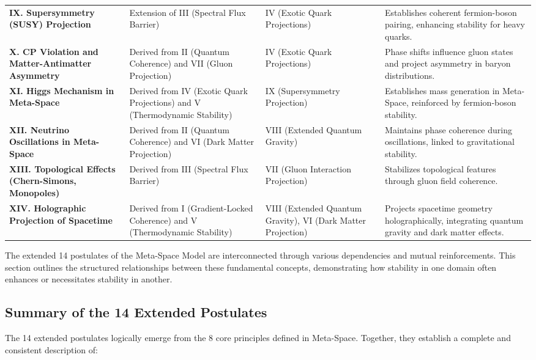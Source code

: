 \documentclass[10.5pt,a4paper]{article}
\begin{document}
{\begin{longtable}{p{3.5cm} p{4cm} p{3.5cm} p{5cm}}
\textbf{IX. Supersymmetry (SUSY) Projection} &
Extension of III (Spectral Flux Barrier) &
IV (Exotic Quark Projections) &
Establishes coherent fermion-boson pairing, enhancing stability for heavy quarks. \\

\textbf{X. CP Violation and Matter-Antimatter Asymmetry} &
Derived from II (Quantum Coherence) and VII (Gluon Projection) &
IV (Exotic Quark Projections) &
Phase shifts influence gluon states and project asymmetry in baryon distributions. \\

\textbf{XI. Higgs Mechanism in Meta-Space} &
Derived from IV (Exotic Quark Projections) and V (Thermodynamic Stability) &
IX (Supersymmetry Projection) &
Establishes mass generation in Meta-Space, reinforced by fermion-boson stability. \\

\textbf{XII. Neutrino Oscillations in Meta-Space} &
Derived from II (Quantum Coherence) and VI (Dark Matter Projection) &
VIII (Extended Quantum Gravity) &
Maintains phase coherence during oscillations, linked to gravitational stability. \\

\textbf{XIII. Topological Effects (Chern-Simons, Monopoles)} &
Derived from III (Spectral Flux Barrier) &
VII (Gluon Interaction Projection) &
Stabilizes topological features through gluon field coherence. \\

\textbf{XIV. Holographic Projection of Spacetime} &
Derived from I (Gradient-Locked Coherence) and V (Thermodynamic Stability) &
VIII (Extended Quantum Gravity), VI (Dark Matter Projection) &
Projects spacetime geometry holographically, integrating quantum gravity and dark matter effects. \\

\hline
\end{longtable}
}
The extended 14 postulates of the Meta-Space Model are interconnected through various dependencies and mutual reinforcements. 
This section outlines the structured relationships between these fundamental concepts, demonstrating how stability in one domain 
often enhances or necessitates stability in another.

\subsection{Summary of the 14 Extended Postulates}

The 14 extended postulates logically emerge from the 8 core principles defined in Meta-Space. Together, they 
establish a complete and consistent description of:
\end{document}
